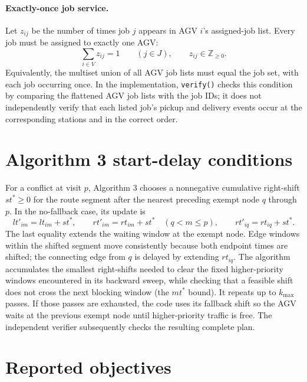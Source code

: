\documentclass[11pt]{article}
\begin{document}
\paragraph{Exactly-once job service.}
Let $z_{ij}$ be the number of times job $j$ appears in AGV $i$'s assigned-job
list. Every job must be assigned to exactly one AGV:
\[
  \sum_{i\in V}z_{ij}=1\qquad(j\in J),\qquad z_{ij}\in\mathbb{Z}_{\ge0}.
\]
Equivalently, the multiset union of all AGV job lists must equal the job set,
with each job occurring once. In the implementation, \texttt{verify()} checks
this condition by comparing the flattened AGV job lists with the job IDs; it
does not independently verify that each listed job's pickup and delivery
events occur at the corresponding stations and in the correct order.

\section{Algorithm 3 start-delay conditions}

For a conflict at visit $p$, Algorithm 3 chooses a nonnegative cumulative
right-shift $st^*\ge0$ for the route segment after the nearest preceding
exempt node $q$ through $p$. In the no-fallback case, its update is
\[
  lt'_{im}=lt_{im}+st^*,\qquad rt'_{im}=rt_{im}+st^*
  \quad(q<m\le p),\qquad
  rt'_{iq}=rt_{iq}+st^*.
\]
The last equality extends the waiting window at the exempt node. Edge windows
within the shifted segment move consistently because both endpoint times are
shifted; the connecting edge from $q$ is delayed by extending $rt_{iq}$. The
algorithm accumulates the smallest right-shifts needed to clear the fixed
higher-priority windows encountered in its backward sweep, while checking
that a feasible shift does not cross the next blocking window (the $mt^*$
bound). It repeats up to $k_{\max}$ passes. If those passes are exhausted,
the code uses its fallback shift so the AGV waits at the previous exempt node
until higher-priority traffic is free. The independent verifier subsequently
checks the resulting complete plan.

\section{Reported objectives}
\end{document}
